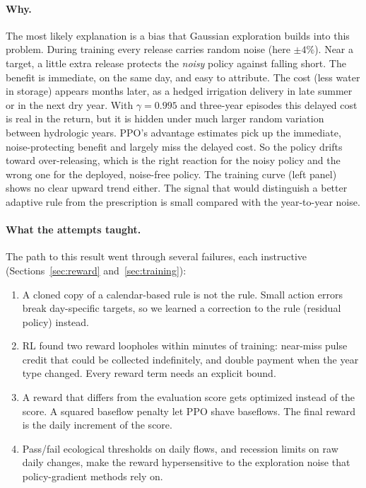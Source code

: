\paragraph{Why.} The most likely explanation is a bias that Gaussian
exploration builds into this problem. During training every release
carries random noise (here $\pm4\%$). Near a target, a little extra release
protects the \emph{noisy} policy against falling short. The benefit is
immediate, on the same day, and easy to attribute. The cost (less water
in storage) appears months later, as a hedged irrigation delivery in late
summer or in the next dry year. With $\gamma=0.995$ and three-year
episodes this delayed cost is real in the return, but it is hidden under
much larger random variation between hydrologic years. PPO's advantage
estimates pick up the immediate, noise-protecting benefit and largely miss
the delayed cost. So the policy drifts toward over-releasing, which is the
right reaction for the noisy policy and the wrong one for the deployed,
noise-free policy. The training curve (left panel) shows no clear upward
trend either. The signal that would distinguish a better adaptive rule
from the prescription is small compared with the year-to-year noise.

\paragraph{What the attempts taught.} The path to this result went through
several failures, each instructive (Sections~\ref{sec:reward}
and~\ref{sec:training}):
\begin{enumerate}\itemsep2pt
\item A cloned copy of a calendar-based rule is not the rule. Small action
  errors break day-specific targets, so we learned a correction to the
  rule (residual policy) instead.
\item RL found two reward loopholes within minutes of training: near-miss
  pulse credit that could be collected indefinitely, and double payment
  when the year type changed. Every reward term needs an explicit bound.
\item A reward that differs from the evaluation score gets optimized
  instead of the score. A squared baseflow penalty let PPO shave
  baseflows. The final reward is the daily increment of the score.
\item Pass/fail ecological thresholds on daily flows, and recession limits
  on raw daily changes, make the reward hypersensitive to the exploration
  noise that policy-gradient methods rely on.
\end{enumerate}
